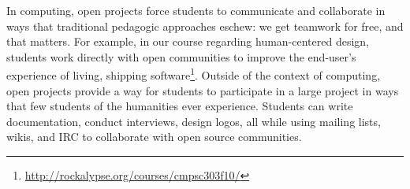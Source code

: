 \documentclass{sig-alternate}
\begin{document}
In computing, open projects force students to communicate and collaborate in ways that traditional pedagogic approaches eschew: we get teamwork for free, and that matters\cite{1404522}. %
For example, in our course regarding human-centered design, students work directly with open communities to improve the end-user's experience of living, shipping software\footnote{\url{http://rockalypse.org/courses/cmpsc303f10/}}. %
Outside of the context of computing, open projects provide a way for students to participate in a large project in ways that few students of the humanities ever experience. %
Students can write documentation, conduct interviews, design logos, all while using mailing lists, wikis, and IRC to collaborate with %
open source communities. %


\begin{comment}       
	
	\and
	\alignauthor  Matthew C. Jadud\\  
	       \affaddr{Allegheny College}\\
	       \affaddr{520 N. Main St.}\\
	       \affaddr{Meadville, PA 16335}\\
	       \email{matthew.c@jadud.com}    
	\alignauthor  Gregory W. Hislop (Moderator)\\
	       \affaddr{Drexel University}\\
				 \affaddr{3141 Chestnut St.}
	       \affaddr{Philadelphia, PA 19104}\\
	       \email{hislop@drexel.edu}	                 
	
	
* [1] [[BegelBibTexChooseOne|Begel BibTeX]]
* [2] http://rockalypse.org/blogs/flyinggator/
* [3] http://concurrency.cc/book/
* [4] http://rockalypse.org/courses/cmpsc303f10/
* [5] http://fedoraproject.org/wiki/Allegheny_Activism_And_Fedora
* [6] http://rockalypse.org/courses/fs101f10/
* [7] [[LPPBibTeX|Lave & Wenger BibTeX]]
\end{comment}
\end{document}
